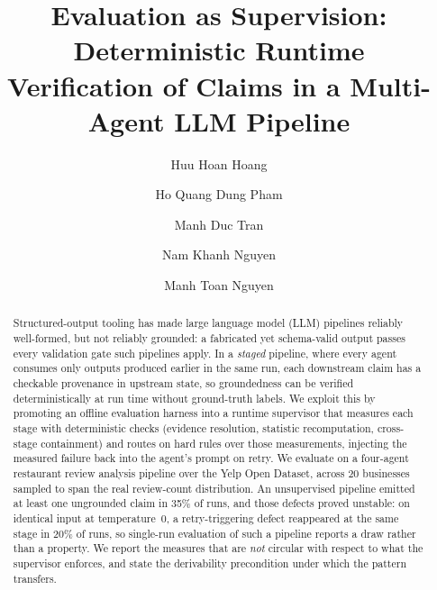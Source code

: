 \documentclass[runningheads]{llncs}
\begin{document}
\title{Evaluation as Supervision: Deterministic Runtime\texorpdfstring{\\}{: }
       Verification of Claims in a Multi-Agent LLM Pipeline}



\author{
Huu Hoan Hoang  \and
Ho Quang Dung Pham\and
Manh Duc Tran \and 
Nam Khanh Nguyen \and
Manh Toan Nguyen
}

\maketitle

\begin{abstract}
Structured-output tooling has made large language model (LLM) pipelines reliably
well-formed, but not reliably grounded: a fabricated yet schema-valid output
passes every validation gate such pipelines apply. In a \emph{staged} pipeline,
where every agent consumes only outputs produced earlier in the same run, each
downstream claim has a checkable provenance in upstream state, so groundedness
can be verified deterministically at run time without ground-truth labels. We
exploit this by promoting an offline evaluation harness into a runtime supervisor
that measures each stage with deterministic checks (evidence resolution,
statistic recomputation, cross-stage containment) and routes on hard rules over
those measurements, injecting the measured failure back into the agent's prompt
on retry. We evaluate on a four-agent restaurant review analysis pipeline over
the Yelp Open Dataset, across 20 businesses sampled to span the real
review-count distribution. An unsupervised pipeline emitted at least one
ungrounded claim in 35\% of runs, and those defects proved unstable: on identical
input at temperature~0, a retry-triggering defect reappeared at the same stage in
20\% of runs, so single-run evaluation of such a pipeline reports a draw rather
than a property. We report the measures that are \emph{not} circular with respect
to what the supervisor enforces, and state the derivability precondition under
which the pattern transfers.

\end{abstract}
\end{document}
